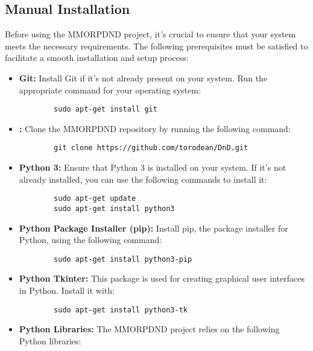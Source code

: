 \subsection{Manual Installation}

Before using the MMORPDND project, it's crucial to ensure that your system meets the necessary requirements. The following prerequisites must be satisfied to facilitate a smooth installation and setup process:

\begin{itemize}
	
	\item \textbf{Git:} Install Git if it's not already present on your system. Run the appropriate command for your operating system:
	
	\begin{verbatim}
		sudo apt-get install git
	\end{verbatim}
	
	\item \textbf{:} Clone the MMORPDND repository by running the following command:
	
	\begin{verbatim}
		git clone https://github.com/torodean/DnD.git
	\end{verbatim}
	
	\item \textbf{Python 3:} Ensure that Python 3 is installed on your system. If it's not already installed, you can use the following commands to install it:
	
	\begin{verbatim}
		sudo apt-get update
		sudo apt-get install python3
	\end{verbatim}
	
	\item \textbf{Python Package Installer (pip):} Install pip, the package installer for Python, using the following command:
	
	\begin{verbatim}
		sudo apt-get install python3-pip
	\end{verbatim}
	
	\item \textbf{Python Tkinter:} This package is used for creating graphical user interfaces in Python. Install it with:
	
	\begin{verbatim}
		sudo apt-get install python3-tk
	\end{verbatim}
	
	\item \textbf{Python Libraries:} The MMORPDND project relies on the following Python libraries:
	

\end{itemize}
